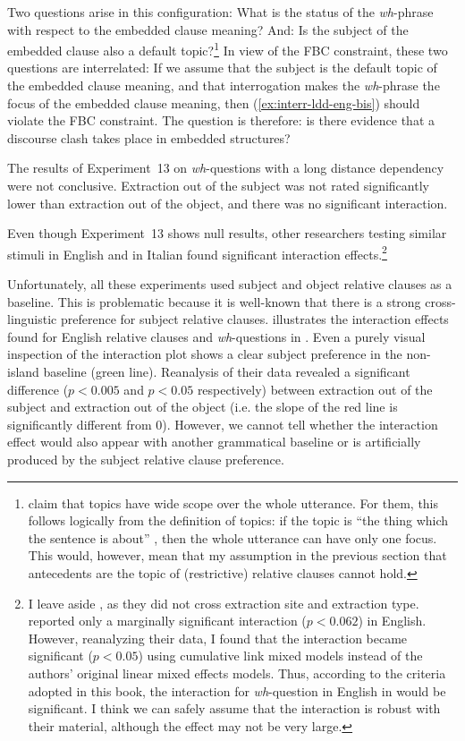 Two questions arise in this configuration: What is the status of the \emph{wh}-phrase with respect to the embedded clause meaning? And: Is the subject of the embedded clause also a default topic?\footnote{\citet{Portner.1998} claim that topics have wide scope over the whole utterance. For them, this follows logically from the definition of topics: if the topic is ``the thing which the sentence is about'' \citep[127]{Portner.1998}, then the whole utterance can have only one focus. This would, however, mean that my assumption in the previous section that antecedents are the topic of (restrictive) relative clauses cannot hold.} In view of the FBC constraint, these two questions are interrelated: If we assume that the subject is the default topic of the embedded clause meaning, and that interrogation makes the \emph{wh}-phrase the focus of the embedded clause meaning, then (\ref{ex:interr-ldd-eng-bis}) should violate the FBC constraint. The question is therefore: is there evidence that a discourse clash takes place in embedded structures?

The results of Experiment~13 on \emph{wh}-questions with a long distance dependency were not conclusive. Extraction out of the subject was not rated significantly lower than extraction out of the object, and there was no significant interaction. 

\begin{sloppypar}
Even though Experiment~13 shows null results, other researchers testing similar stimuli in English \citep{Sprouse.2007.PhD,Sprouse.2012,Sprouse.2016} and in Italian \citep{Sprouse.2016} found significant interaction effects.\footnote{I leave aside \citet{Sprouse.2011}, as they did not cross extraction site and extraction type. \citet{Sprouse.2016} reported only a marginally significant interaction ($p<0.062$) in English. However, reanalyzing their data, I found that the interaction became significant ($p<0.05$) using cumulative link mixed models instead of the authors' original linear mixed effects models. Thus, according to the criteria adopted in this book, the interaction for \textit{wh}-question in English in \citet{Sprouse.2016} would be significant. I think we can safely assume that the interaction is robust with their material, although the effect may not be very large.}
\end{sloppypar}

Unfortunately, all these experiments used subject and object relative clauses as a baseline. This is problematic because it is well-known that there is a strong cross-linguistic preference for subject relative clauses.  illustrates the interaction effects found for English relative clauses and \emph{wh}-questions in \citet{Sprouse.2016}. Even a purely visual inspection of the interaction plot shows a clear subject preference in the non-island baseline (green line). Reanalysis of their data revealed a significant difference ($p<0.005$ and $p<0.05$ respectively) between extraction out of the subject and extraction out of the object (i.e. the slope of the red line is significantly different from 0). However, we cannot tell whether the interaction effect would also appear with another grammatical baseline or is artificially produced by the subject relative clause preference.

